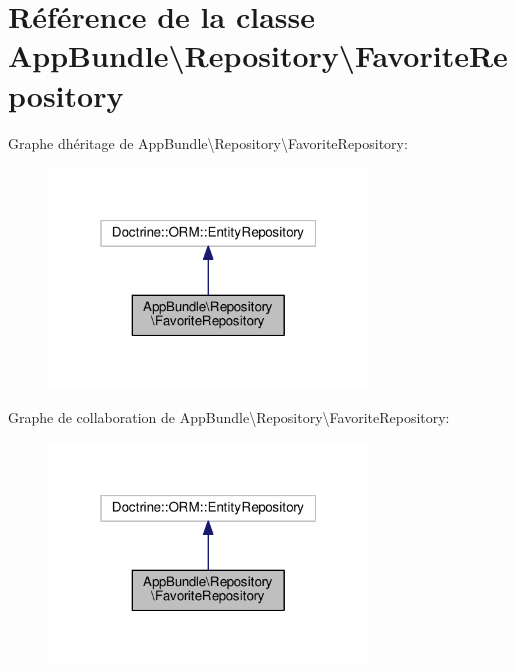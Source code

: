 \hypertarget{classAppBundle_1_1Repository_1_1FavoriteRepository}{}\section{Référence de la classe App\+Bundle\textbackslash{}Repository\textbackslash{}Favorite\+Repository}
\label{classAppBundle_1_1Repository_1_1FavoriteRepository}


Graphe d\textquotesingle{}héritage de App\+Bundle\textbackslash{}Repository\textbackslash{}Favorite\+Repository\+:\nopagebreak
\begin{figure}[H]
\begin{center}
\leavevmode
\includegraphics[width=241pt]{classAppBundle_1_1Repository_1_1FavoriteRepository__inherit__graph}
\end{center}
\end{figure}


Graphe de collaboration de App\+Bundle\textbackslash{}Repository\textbackslash{}Favorite\+Repository\+:\nopagebreak
\begin{figure}[H]
\begin{center}
\leavevmode
\includegraphics[width=241pt]{classAppBundle_1_1Repository_1_1FavoriteRepository__coll__graph}
\end{center}
\end{figure}


